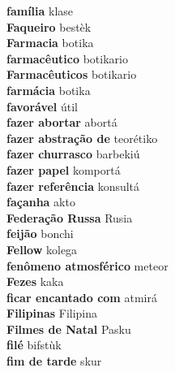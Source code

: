 \textbf{ família  } klase \\
\textbf{ Faqueiro  } bestèk \\
\textbf{ Farmacia  } botika \\
\textbf{ farmacêutico  } botikario \\
\textbf{ Farmacêuticos  } botikario \\
\textbf{ farmácia  } botika \\
\textbf{ favorável  } útil \\
\textbf{ fazer abortar  } abortá \\
\textbf{ fazer abstração de  } teorétiko \\
\textbf{ fazer churrasco  } barbekiú \\
\textbf{ fazer papel  } komportá \\
\textbf{ fazer referência  } konsultá \\
\textbf{ façanha  } akto \\
\textbf{ Federação Russa  } Rusia \\
\textbf{ feijão  } bonchi \\
\textbf{ Fellow  } kolega \\
\textbf{ fenômeno atmosférico  } meteor \\
\textbf{ Fezes  } kaka \\
\textbf{ ficar encantado com  } atmirá \\
\textbf{ Filipinas  } Filipina \\
\textbf{ Filmes de Natal  } Pasku \\
\textbf{ filé  } bifstùk \\
\textbf{ fim de tarde  } skur \\
